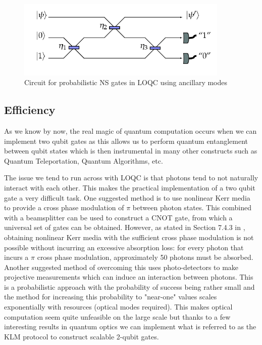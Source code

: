 \begin{figure}[h]
    \centering
    \includegraphics[width=0.9\textwidth]{images/NS gate.png}
    \caption{Circuit for probabilistic NS gates in LOQC using ancillary modes}\label{fig:NS_gate}
\end{figure}



\subsection{Efficiency}
As we know by now, the real magic of quantum computation occurs when we can implement two qubit gates as this allows us to perform quantum entanglement between qubit states which is then instrumental in many other constructs such as Quantum Teleportation, Quantum Algorithms, etc.

The issue we tend to run across with LOQC is that photons tend to not naturally interact with each other. This makes the practical implementation of a two qubit gate a very difficult task. One suggested method is to use nonlinear Kerr media to provide a cross phase modulation of $\pi$ between photon states. This combined with a beamsplitter can be used to construct a CNOT gate, from which a universal set of gates can be obtained. However, as stated in Section 7.4.3 in \cite{nielsen_chuang_2010}, obtaining nonlinear Kerr media with the sufficient cross phase modulation is not possible without incurring an excessive absorption loss: for every photon that incurs a $\pi$ cross phase modulation, approximately 50 photons must be absorbed. Another suggested method of overcoming this uses photo-detectors to make projective measurements which can induce an interaction between photons\cite{Kok:2005jip}. This is a probabilistic approach with the probability of success being rather small and the method for increasing this probability to "near-one" values scales exponentially with resources (optical modes required). This makes optical computation seem quite unfeasible on the large scale but thanks to a few interesting results in quantum optics we can implement what is referred to as the KLM protocol to construct scalable 2-qubit gates.

